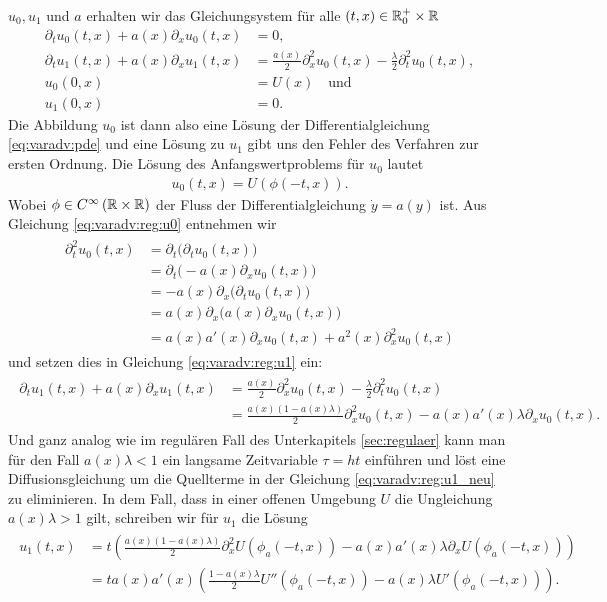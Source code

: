 $u_0, u_1$ und $a$ erhalten wir das Gleichungsystem für alle $(t,x) \in \mathbb R^+_0
\times \mathbb R$
\begin{align}
\label{eq:varadv:reg:u0}
\partial_t u_0(t,x) + a(x) \partial_x u_0(t, x) &= 0,\\
\label{eq:varadv:reg:u1}
\partial_t u_1(t,x) + a(x) \partial_x u_1(t, x) &= \frac{a(x)}{2} \partial^2_x u_0(t,x) - \frac{\lambda}{2} \partial^2_t u_0(t,x),\\
u_0(0,x) &= U(x) \quad \text{und}\\
u_1(0,x) &= 0.
\end{align}
Die Abbildung $u_0$ ist dann also eine Lösung der Differentialgleichung
\eqref{eq:varadv:pde} und eine Lösung zu $u_1$ gibt uns den Fehler des Verfahren
zur ersten Ordnung.
Die Lösung des Anfangswertproblems für $u_0$ lautet 
\begin{align}
\label{eq:varadv:reg:u0_loesung}
u_0(t,x) = U( \phi(-t, x) ).
\end{align}
Wobei $\phi \in C^\infty \left( \mathbb R \times \mathbb R \right)$ der Fluss der Differentialgleichung $\dot y = a(y)$ ist.
Aus Gleichung \eqref{eq:varadv:reg:u0} entnehmen wir
\begin{align}
\begin{split}
\partial^2_t u_0(t,x) &= \partial_t \bigl( \partial_t u_0(t,x) \bigr)\\
&= \partial_t \bigl( - a(x) \partial_x u_0(t, x) \bigr)\\
&= - a(x) \partial_x \bigl( \partial_t u_0(t, x) \bigr)\\
&= a(x) \partial_x \bigl( a(x) \partial_x u_0(t, x) \bigr)\\
&= a(x) a'(x) \partial_x u_0(t,x) + a^2(x) \partial^2_x u_0(t,x)
\end{split}
\end{align}
und setzen dies in Gleichung \eqref{eq:varadv:reg:u1} ein:
\begin{align}\label{eq:varadv:reg:u1_neu}
\begin{split}
\partial_t u_1(t,x) + a(x) \partial_x u_1(t, x) &= \frac{a(x)}{2} \partial^2_x u_0(t,x) - \frac{\lambda}{2} \partial^2_t u_0(t,x)\\
&= \frac{a(x)(1 - a(x) \lambda)}{2} \partial^2_x u_0(t,x) - a(x) a'(x) \lambda \partial_x u_0(t,x).
\end{split}
\end{align}
Und ganz analog wie im regulären Fall des Unterkapitels \ref{sec:regulaer} kann
man für den Fall $a(x)\lambda < 1$ ein langsame Zeitvariable $\tau = ht$
einführen und löst eine Diffusionsgleichung um die Quellterme in der Gleichung
\eqref{eq:varadv:reg:u1_neu} zu eliminieren.
In dem Fall, dass in einer offenen Umgebung $U$ die Ungleichung $a(x)\lambda > 1$
gilt, schreiben wir für $u_1$ die Lösung
\begin{align}
\begin{split}
u_1(t,x) &= t \left( \frac{a(x)(1 - a(x) \lambda)}{2} \partial^2_x U( \phi_a(-t, x) ) - a(x) a'(x) \lambda \partial_x U( \phi_a(-t, x) )\right)\\
&= t a(x) a'(x) \left( \frac{1 - a(x) \lambda}{2} U''( \phi_a(-t, x) ) - a(x) \lambda U'( \phi_a(-t, x) )\right).
\end{split}
\end{align}

